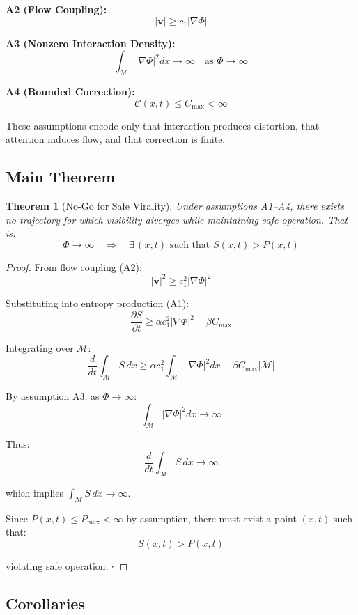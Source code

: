 \documentclass[12pt,a4paper]{article}
\newtheorem{theorem}{Theorem}
\begin{document}
\medskip
\noindent\textbf{A2 (Flow Coupling):}
\[
|\mathbf{v}| \geq c_1 |\nabla \Phi|
\]

\medskip
\noindent\textbf{A3 (Nonzero Interaction Density):}
\[
\int_{\mathcal{M}} |\nabla \Phi|^2 dx \rightarrow \infty
\quad \text{as } \Phi \rightarrow \infty
\]

\medskip
\noindent\textbf{A4 (Bounded Correction):}
\[
\mathcal{C}(x,t) \leq C_{\max} < \infty
\]

\medskip

These assumptions encode only that interaction produces distortion, that attention induces flow, and that correction is finite.

\subsection{Main Theorem}

\begin{theorem}[No-Go for Safe Virality]
Under assumptions \emph{A1}--\emph{A4}, there exists no trajectory for which visibility diverges while maintaining safe operation. That is:
\[
\Phi \rightarrow \infty
\quad \Longrightarrow \quad
\exists\, (x,t) \text{ such that } S(x,t) > P(x,t)
\]
\end{theorem}

\begin{proof}
From flow coupling (A2):
\[
|\mathbf{v}|^2 \geq c_1^2 |\nabla \Phi|^2
\]

Substituting into entropy production (A1):
\[
\frac{\partial S}{\partial t}
\geq
\alpha c_1^2 |\nabla \Phi|^2 - \beta C_{\max}
\]

Integrating over $\mathcal{M}$:
\[
\frac{d}{dt} \int_{\mathcal{M}} S\,dx
\geq
\alpha c_1^2 \int_{\mathcal{M}} |\nabla \Phi|^2 dx - \beta C_{\max} |\mathcal{M}|
\]

By assumption A3, as $\Phi \to \infty$:
\[
\int_{\mathcal{M}} |\nabla \Phi|^2 dx \to \infty
\]

Thus:
\[
\frac{d}{dt} \int_{\mathcal{M}} S\,dx \to \infty
\]

which implies $\int_{\mathcal{M}} S\,dx \to \infty$.

Since $P(x,t) \leq P_{\max} < \infty$ by assumption, there must exist a point $(x,t)$ such that:
\[
S(x,t) > P(x,t)
\]

violating safe operation. \hfill$\square$
\end{proof}


\subsection{Corollaries}
\end{document}
